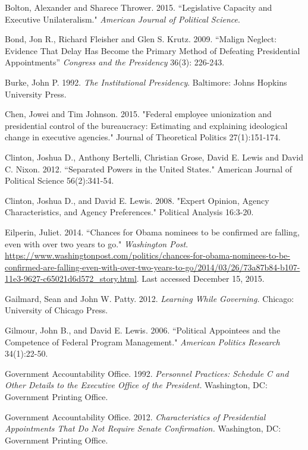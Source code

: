 \documentclass[12pt]{article}
\begin{document}
\noindent \hangindent=0.7cm Bolton, Alexander and Sharece Thrower. 2015. ``Legislative Capacity and Executive Unilateralism." \textit{American Journal of Political Science}. 

\noindent \hangindent=0.7cm Bond, Jon R., Richard Fleisher and Glen S. Krutz. 2009. ``Malign Neglect: Evidence That Delay Has Become the Primary Method of Defeating Presidential Appointments'' \textit{Congress and the Presidency} 36(3): 226-243.

\noindent \hangindent=0.7cm Burke, John P. 1992. \textit{The Institutional Presidency}. Baltimore: Johns Hopkins University Press. 

\noindent \hangindent=0.7cm Chen, Jowei and Tim Johnson. 2015. "Federal employee unionization and presidential control of the bureaucracy: Estimating and explaining ideological change in executive agencies." Journal of Theoretical Politics 27(1):151-174.

\noindent \hangindent=0.7cm Clinton, Joshua D., Anthony Bertelli, Christian Grose, David E. Lewis and David C. Nixon. 2012. ``Separated Powers in the United States." American Journal of Political Science 56(2):341-54.

\noindent \hangindent=0.7cm Clinton, Joshua D., and David E. Lewis. 2008. "Expert Opinion, Agency Characteristics, and Agency Preferences." Political Analysis 16:3-20.

\noindent \hangindent=0.7cm Eilperin, Juliet. 2014. ``Chances for Obama nominees to be confirmed are falling, even with over two years to go." \textit{Washington Post}. \url{https://www.washingtonpost.com/politics/chances-for-obama-nominees-to-be-confirmed-are-falling-even-with-over-two-years-to-go/2014/03/26/73a87b84-b107-11e3-9627-c65021d6d572_story.html}. Last accessed December 15, 2015. 

\noindent \hangindent=0.7cm Gailmard, Sean and John W. Patty. 2012. \textit{Learning While Governing.} Chicago: University of Chicago Press. 

\noindent \hangindent=0.7cm Gilmour, John B., and David E. Lewis. 2006. ``Political Appointees and the Competence of Federal Program Management." \textit{American Politics Research} 34(1):22-50. 

\noindent \hangindent=0.7cm Government Accountability Office. 1992. \textit{Personnel Practices: Schedule C and Other Details to the Executive Office of the President.} Washington, DC: Government Printing Office.

\noindent \hangindent=0.7cm Government Accountability Office. 2012. \textit{Characteristics of Presidential Appointments That Do Not Require Senate Confirmation.} Washington, DC: Government Printing Office.
\end{document}

